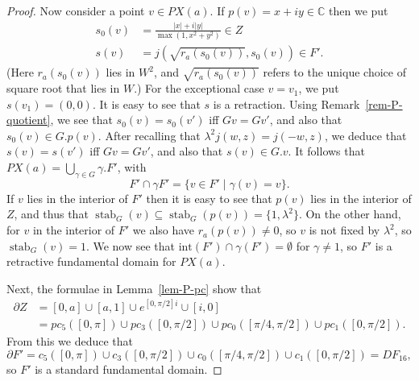 \documentclass[reqno]{amsart}
\newcommand{\stab}	{\operatorname{stab}}
\newcommand{\gm}        {\gamma}
\newcommand{\lm}        {\lambda}
\newcommand{\C}         {{\mathbb{C}}}
\newcommand{\st}        {\;|\;}
\newcommand{\sse}       {\subseteq}
\renewcommand{\:}{\colon}
\theoremstyle{definition}
\begin{document}
\begin{proof}
 Now consider a point $v\in PX(a)$.  If $p(v)=x+iy\in\C$ then we put
 \begin{align*}
  s_0(v) &= \frac{|x| + i|y|}{\max(1,x^2+y^2)} \in Z \\
  s(v) &= j(\sqrt{r_a(s_0(v))},s_0(v)) \in F'.
 \end{align*}
 (Here $r_a(s_0(v))$ lies in $W^2$, and $\sqrt{r_a(s_0(v))}$ refers to
 the unique choice of square root that lies in $W$.)  For the
 exceptional case $v=v_1$, we put $s(v_1)=(0,0)$.  It is easy to see
 that $s$ is a retraction.  Using Remark~\ref{rem-P-quotient}, we
 see that $s_0(v)=s_0(v')$ iff $Gv=Gv'$, and also that
 $s_0(v)\in G.p(v)$.  After recalling that
 $\lm^2j(w,z)=j(-w,z)$, we deduce that $s(v)=s(v')$ iff $Gv=Gv'$, and
 also that $s(v)\in G.v$.  It follows that
 $PX(a)=\bigcup_{\gm\in G}\gm.F'$, with
 \[ F'\cap\gm F' = \{v\in F'\st \gm(v)=v\}. \]
 If $v$ lies in the interior of $F'$ then it is easy to see that
 $p(v)$ lies in the interior of $Z$, and thus that
 $\stab_G(v)\sse\stab_G(p(v))=\{1,\lm^2\}$.  On the other hand, for
 $v$ in the interior of $F'$ we also have $r_a(p(v))\neq 0$, so $v$ is
 not fixed by $\lm^2$, so $\stab_G(v)=1$.  We now see that
 $\text{int}(F')\cap\gm(F')=\emptyset$ for $\gm\neq 1$, so $F'$ is a
 retractive fundamental domain for $PX(a)$.

 Next, the formulae in Lemma~\ref{lem-P-pc} show that
 \begin{align*}
  \partial Z &= [0,a] \cup [a,1] \cup e^{[0,\pi/2]i} \cup [i,0] \\
   &= pc_5([0,\pi])\cup pc_3([0,\pi/2])\cup
      pc_0([\pi/4,\pi/2]) \cup pc_1([0,\pi/2]).
 \end{align*}
 From this we deduce that
 \[ \partial F' =
      c_5([0,\pi])\cup c_3([0,\pi/2])\cup
      c_0([\pi/4,\pi/2]) \cup c_1([0,\pi/2]) = DF_{16},
 \]
 so $F'$ is a standard fundamental domain.
\end{proof}
\end{document}
